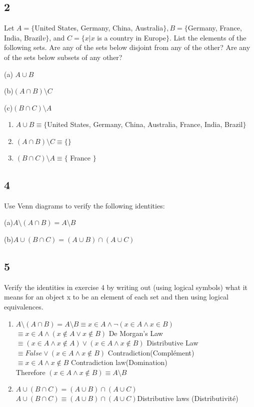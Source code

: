 \documentclass{article}
\begin{document}
\subsection{2}
Let $A = \{$United States, Germany, China, Australia$\}, B = \{ $Germany, France, India, Brazil$v\}$, and $C = \{x \vert  x$ is a country in Europe$\}$. List the elements of the following sets. Are any of the sets below disjoint from any of the other? Are any of the sets below subsets of any other?

(a) $A \cup B$

(b)$(A \cap B)\setminus C$

(c)$(B \cap C)\setminus A$
\begin{enumerate}[label = (\alph*)]
    \item 
$A \cup B \equiv \{$United States, Germany, China, Australia, France, India, Brazil$\}$
    \item 
$(A \cap B)\setminus C \equiv \{ \}$
    \item
$(B \cap C)\setminus A \equiv \{$ France $\}$
\end{enumerate}
\subsection{4}
Use Venn diagrams to verify the following identities:

(a)$A \setminus(A \cap B)= A \setminus B$

(b)$A \cup (B \cap C) = (A \cup B)\cap (A \cup C)$

\subsection{5}
Verify the identities in exercise 4 by writing out (using logical symbols) what it means for an object x to be an element of each set and then using logical equivalences.
\begin{enumerate}[label = (\alph*)]
    \item 
    $A \setminus(A \cap B)= A \setminus B \equiv x \in A \land \neg (x \in A \land x \in B)$ 
    \\
    $\equiv x \in A \land (x \notin A \lor x \notin B)$ De Morgan's Law
    \\
    $\equiv (x \in A \land x \notin A) \lor (x \in A \land x \notin B)$ Distributive Law
    \\
    $\equiv False \lor (x \in A \land x \notin B)$ Contradiction(Complément)
    \\
    $\equiv x \in A \land x \notin B$ 
    Contradiction law(Domination)
    \\
    Therefore $(x \in A \land  x \notin B ) \equiv A \setminus B$
    \item
    $A \cup (B \cap C) = (A \cup B)\cap (A \cup C)$
    \\
    $A \cup (B \cap C) \equiv (A \cup B)\cap (A \cup C)$Distributive laws (Distributivité)
\end{enumerate}
\end{document}
